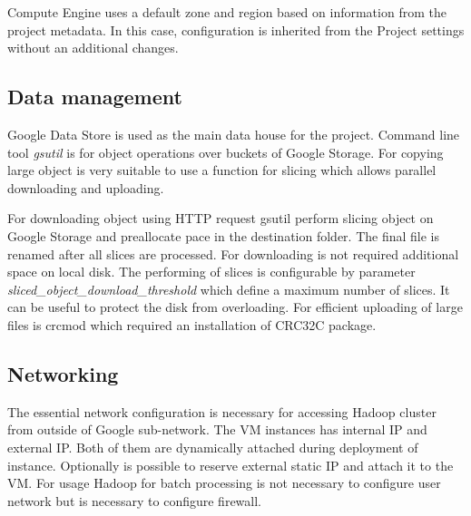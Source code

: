 \documentclass[a4paper,12pt,oneside]{report}
\begin{document}
	Compute Engine uses a default zone and region based on information from the
	project metadata. In this case,	configuration is inherited from the Project 
	settings without an additional changes.
	
	
	\subsection{Data management}
	Google Data Store is used as the main data house for the project. Command
	line tool \textit{gsutil} is for  object operations over buckets of Google Storage. 
	For copying large	object is very suitable to use 	a function for slicing which allows parallel 
	downloading and uploading.
	
	For downloading object using HTTP request gsutil perform slicing object on
	Google Storage  and preallocate pace in the destination folder. 
	The final file is renamed after all slices are	processed. For downloading 
	is not required additional space on local disk. The performing of slices is configurable by parameter
	\textit{sliced\_object\_download\_threshold} which 	define a maximum number of slices. It can be 
	useful to protect the disk from overloading. For efficient uploading of large
	files is crcmod which required 	an installation  of CRC32C package. 
	
	\subsection{Networking}
	The essential network configuration is necessary  for accessing Hadoop cluster
	from outside of Google sub-network. The VM instances has internal IP and
	external IP. Both of them are dynamically attached during deployment of
	instance. Optionally is possible to reserve external static IP and attach it to
	the VM.  For usage Hadoop for batch processing is not necessary to configure
	user network but is necessary to configure firewall. 
	
\end{document}

